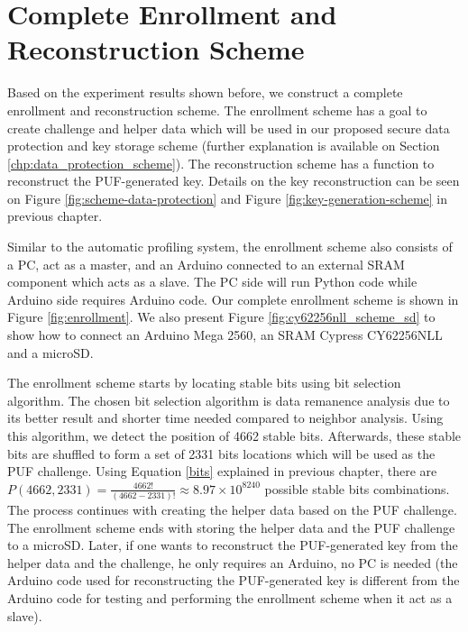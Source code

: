 \section{Complete Enrollment and Reconstruction Scheme}\label{ch:complete_enrollment_scheme}
Based on the experiment results shown before, we construct a complete enrollment and reconstruction scheme. The enrollment scheme has a goal to create challenge and helper data which will be used in our proposed secure data protection and key storage scheme (further explanation is available on Section \ref{chp:data_protection_scheme}). The reconstruction scheme has a function to reconstruct the PUF-generated key. Details on the key reconstruction can be seen on Figure \ref{fig:scheme-data-protection} and Figure \ref{fig:key-generation-scheme} in previous chapter.

Similar to the automatic profiling system, the enrollment scheme also consists of a PC, act as a master, and an Arduino connected to an external SRAM component which acts as a slave. The PC side will run Python code while Arduino side requires Arduino code.
Our complete enrollment scheme is shown in Figure \ref{fig:enrollment}. We also present Figure \ref{fig:cy62256nll_scheme_sd} to show how to connect an Arduino Mega 2560, an SRAM Cypress CY62256NLL and a microSD.

The enrollment scheme starts by locating stable bits using bit selection algorithm. The chosen bit selection algorithm is data remanence analysis due to its better result and shorter time needed compared to neighbor analysis. Using this algorithm, we detect the position of 4662 stable bits. Afterwards, these stable bits are shuffled to form a set of 2331 bits locations which will be used as the PUF challenge. Using Equation \ref{bits} explained in previous chapter, there are $P(4662, 2331)=\frac{4662!}{\left( 4662-2331 \right) !}\approx 8.97\times10^{8240}$ possible stable bits combinations.
The process continues with creating the helper data based on the PUF challenge. The enrollment scheme ends with storing the helper data and the PUF challenge to a microSD. Later, if one wants to reconstruct the PUF-generated key from the helper data and the challenge, he only requires an Arduino, no PC is needed (the Arduino code used for reconstructing the PUF-generated key is different from the Arduino code for testing and performing the enrollment scheme when it act as a slave).

